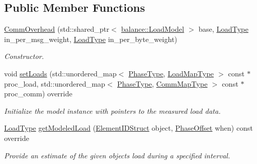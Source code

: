 \subsection*{Public Member Functions}
\begin{DoxyCompactItemize}
\item 
\hyperlink{structvt_1_1vrt_1_1collection_1_1balance_1_1_comm_overhead_a43c9a18c3436ed642061286b59e0d5b3}{Comm\+Overhead} (std\+::shared\+\_\+ptr$<$ \hyperlink{structvt_1_1vrt_1_1collection_1_1balance_1_1_load_model}{balance\+::\+Load\+Model} $>$ base, \hyperlink{namespacevt_a8fb51741340b87d7aaee0bef60e9896b}{Load\+Type} in\+\_\+per\+\_\+msg\+\_\+weight, \hyperlink{namespacevt_a8fb51741340b87d7aaee0bef60e9896b}{Load\+Type} in\+\_\+per\+\_\+byte\+\_\+weight)
\begin{DoxyCompactList}\small\item\em Constructor. \end{DoxyCompactList}\item 
void \hyperlink{structvt_1_1vrt_1_1collection_1_1balance_1_1_comm_overhead_a5208f7952b3a327ca118e9be2f4c5a55}{set\+Loads} (std\+::unordered\+\_\+map$<$ \hyperlink{namespacevt_a46ce6733d5cdbd735d561b7b4029f6d7}{Phase\+Type}, \hyperlink{namespacevt_1_1vrt_1_1collection_1_1balance_a5339303db2e1ce964d783a53fd74e6b1}{Load\+Map\+Type} $>$ const $\ast$proc\+\_\+load, std\+::unordered\+\_\+map$<$ \hyperlink{namespacevt_a46ce6733d5cdbd735d561b7b4029f6d7}{Phase\+Type}, \hyperlink{namespacevt_1_1vrt_1_1collection_1_1balance_a01ee1fb0ae2da1d2ab7fdca3be9ae351}{Comm\+Map\+Type} $>$ const $\ast$proc\+\_\+comm) override
\begin{DoxyCompactList}\small\item\em Initialize the model instance with pointers to the measured load data. \end{DoxyCompactList}\item 
\hyperlink{namespacevt_a8fb51741340b87d7aaee0bef60e9896b}{Load\+Type} \hyperlink{structvt_1_1vrt_1_1collection_1_1balance_1_1_comm_overhead_a96f3be9a9d60c91d9131f481ae96fb53}{get\+Modeled\+Load} (\hyperlink{namespacevt_1_1vrt_1_1collection_1_1balance_a9f5b53fafb270212279a4757d2c4cd28}{Element\+I\+D\+Struct} object, \hyperlink{structvt_1_1vrt_1_1collection_1_1balance_1_1_phase_offset}{Phase\+Offset} when) const override
\begin{DoxyCompactList}\small\item\em Provide an estimate of the given object\textquotesingle{}s load during a specified interval. \end{DoxyCompactList}\end{DoxyCompactItemize}
